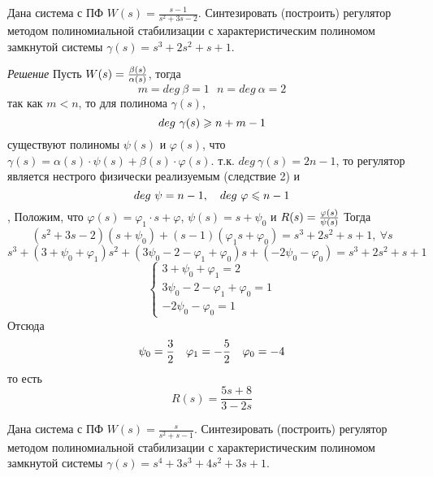 \documentclass[../../TAU.tex]{subfiles}
\begin{document}
    \examp
    {
        Дана система с ПФ $W(s) = \frac{s-1}{s^2+3s-2}$. Синтезировать (построить) регулятор методом полиномиальной стабилизации с характеристическим полиномом замкнутой системы $\gamma(s) = s^3+2s^2+s+1$.
    }

    \textit{Решение}
    {
        Пусть $W(s) = {\beta(s)\over \alpha(s)}$, тогда
        $$
            m=deg\ \beta =1 \ \ \ n=deg\ \alpha=2
        $$
        так как $m<n$, то для полинома $\gamma(s)$,
        $$
            deg\ \gamma(s) \geqslant n + m - 1
        $$
        существуют полиномы $\psi(s)$ и $\varphi(s)$, что $\gamma(s)=\alpha(s)\cdot\psi(s)+\beta(s)\cdot\varphi(s)$.
        т.к. $deg\ \gamma(s)=2n-1$, то регулятор является нестрого физически реализуемым (следствие 2) и
        $$
            deg\ \psi=n-1,\ \ \  deg\ \varphi \leqslant n-1
        $$,
        Положим, что $\varphi(s)=\varphi_1\cdot s+\varphi$, $\psi(s)=s+\psi_0$ и 
        $R(s)={\varphi(s)\over\psi(s)}$
        Тогда
        $$
            (s^2+3s-2)(s+\psi_0)+(s-1)(\varphi_1s+\varphi_0)=s^3+2s^2+s+1,\ \forall s
        $$ 
        $$
            s^3+(3+\psi_0+\varphi_1)s^2+(3\psi_0-2-\varphi_1+\varphi_0)s+(-2\psi_0-\varphi_0)=s^3+2s^2+s+1
        $$
        $$
        \begin{cases}
            3+\psi_0+\varphi_1=2 \\
            3\psi_0-2-\varphi_1+\varphi_0=1 \\
            -2\psi_0-\varphi_0=1
        \end{cases}
        $$
        Отсюда
        $$
            \psi_0={3\over2} \ \ \ \varphi_1= -{5\over2} \ \ \  \varphi_0=-4
        $$
        то есть
        $$
            R(s)=\frac{5s+8}{3-2s}
        $$
    }

    \examp
    {
        Дана система с ПФ $W(s) = \frac{s}{s^2+s-1}$. Синтезировать (построить) регулятор методом полиномиальной стабилизации с характеристическим полиномом замкнутой системы $\gamma(s) = s^4+3s^3+4s^2+3s+1$.
    }
\end{document}
